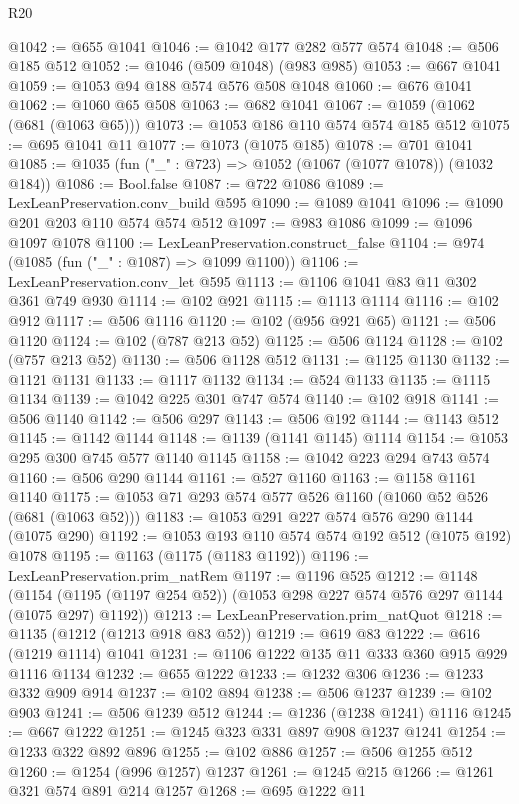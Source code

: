 \begin{lexlean}{R20}
\begin{coremodule}
@1042 := @655 @1041
@1046 := @1042 @177 @282 @577 @574
@1048 := @506 @185 @512
@1052 := @1046 (@509 @1048) (@983 @985)
@1053 := @667 @1041
@1059 := @1053 @94 @188 @574 @576 @508 @1048
@1060 := @676 @1041
@1062 := @1060 @65 @508
@1063 := @682 @1041
@1067 := @1059 (@1062 (@681 (@1063 @65)))
@1073 := @1053 @186 @110 @574 @574 @185 @512
@1075 := @695 @1041 @11
@1077 := @1073 (@1075 @185)
@1078 := @701 @1041
@1085 := @1035 (fun ("_" : @723) => @1052 (@1067 (@1077 @1078)) (@1032 @184))
@1086 := Bool.false
@1087 := @722 @1086
@1089 := LexLeanPreservation.conv_build @595
@1090 := @1089 @1041
@1096 := @1090 @201 @203 @110 @574 @574 @512
@1097 := @983 @1086
@1099 := @1096 @1097 @1078
@1100 := LexLeanPreservation.construct_false
@1104 := @974 (@1085 (fun ("_" : @1087) => @1099 @1100))
@1106 := LexLeanPreservation.conv_let @595
@1113 := @1106 @1041 @83 @11 @302 @361 @749 @930
@1114 := @102 @921
@1115 := @1113 @1114
@1116 := @102 @912
@1117 := @506 @1116
@1120 := @102 (@956 @921 @65)
@1121 := @506 @1120
@1124 := @102 (@787 @213 @52)
@1125 := @506 @1124
@1128 := @102 (@757 @213 @52)
@1130 := @506 @1128 @512
@1131 := @1125 @1130
@1132 := @1121 @1131
@1133 := @1117 @1132
@1134 := @524 @1133
@1135 := @1115 @1134
@1139 := @1042 @225 @301 @747 @574
@1140 := @102 @918
@1141 := @506 @1140
@1142 := @506 @297
@1143 := @506 @192
@1144 := @1143 @512
@1145 := @1142 @1144
@1148 := @1139 (@1141 @1145) @1114
@1154 := @1053 @295 @300 @745 @577 @1140 @1145
@1158 := @1042 @223 @294 @743 @574
@1160 := @506 @290 @1144
@1161 := @527 @1160
@1163 := @1158 @1161 @1140
@1175 := @1053 @71 @293 @574 @577 @526 @1160 (@1060 @52 @526 (@681 (@1063 @52)))
@1183 := @1053 @291 @227 @574 @576 @290 @1144 (@1075 @290)
@1192 := @1053 @193 @110 @574 @574 @192 @512 (@1075 @192) @1078
@1195 := @1163 (@1175 (@1183 @1192))
@1196 := LexLeanPreservation.prim_natRem
@1197 := @1196 @525
@1212 := @1148
    (@1154 (@1195 (@1197 @254 @52)) (@1053 @298 @227 @574 @576 @297 @1144 (@1075 @297) @1192))
@1213 := LexLeanPreservation.prim_natQuot
@1218 := @1135 (@1212 (@1213 @918 @83 @52))
@1219 := @619 @83
@1222 := @616 (@1219 @1114) @1041
@1231 := @1106 @1222 @135 @11 @333 @360 @915 @929 @1116 @1134
@1232 := @655 @1222
@1233 := @1232 @306
@1236 := @1233 @332 @909 @914
@1237 := @102 @894
@1238 := @506 @1237
@1239 := @102 @903
@1241 := @506 @1239 @512
@1244 := @1236 (@1238 @1241) @1116
@1245 := @667 @1222
@1251 := @1245 @323 @331 @897 @908 @1237 @1241
@1254 := @1233 @322 @892 @896
@1255 := @102 @886
@1257 := @506 @1255 @512
@1260 := @1254 (@996 @1257) @1237
@1261 := @1245 @215
@1266 := @1261 @321 @574 @891 @214 @1257
@1268 := @695 @1222 @11

\end{coremodule}
\end{lexlean}
